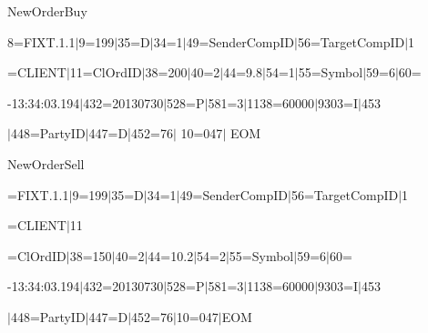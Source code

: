 \pagebreak





{\sf   NewOrderBuy}





  \noindent


{\sf


 8=FIXT.1.1$\vert$9=199$\vert$35=D$\vert$34=1$\vert$49=SenderCompID$\vert$56=TargetCompID$\vert$1}





\noindent


{\sf


=CLIENT$\vert$11=ClOrdID$\vert$38=200$\vert$40=2$\vert$44=9.8$\vert$54=1$\vert$55=Symbol$\vert$59=6$\vert$60=}





\noindent


{-13:34:03.194$\vert$432=20130730$\vert$528=P$\vert$581=3$\vert$1138=60000$\vert$9303=I$\vert$453}





\noindent


{$\vert$448=PartyID$\vert$447=D|452=76$\vert$ 10=047$\vert$ EOM}





{\sf    NewOrderSell}





  \noindent


{=FIXT.1.1$\vert$9=199$\vert$35=D$\vert$34=1$\vert$49=SenderCompID$\vert$56=TargetCompID$\vert$1}





\noindent


{\sf =CLIENT$\vert$11


=ClOrdID$\vert$38=150$\vert$40=2$\vert$44=10.2$\vert$54=2$\vert$55=Symbol$\vert$59=6$\vert$60=}





\noindent


{-13:34:03.194$\vert$432=20130730$\vert$528=P$\vert$581=3$\vert$1138=60000$\vert$9303=I$\vert$453}





\noindent


{$\vert$448=PartyID$\vert$447=D$\vert$452=76$\vert$10=047$\vert$EOM}






